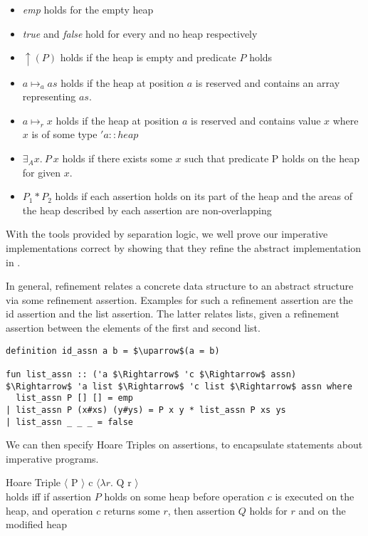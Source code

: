 \begin{itemize}
    \item \textit{emp} holds for the empty heap
    \item \textit{true} and \textit{false} hold for every and no heap respectively
    \item $\uparrow(P)$ holds if the heap is empty and predicate $P$ holds
    \item $a \mapsto_a as$ holds if the heap at position $a$ is reserved and contains
    an array representing $as$.
    \item $a \mapsto_r x$ holds if the heap at position $a$ is reserved and contains
    value $x$ where $x$ is of some type $'a::heap$
    \item $\exists_A x.\ P\ x$ holds if there exists some $x$ such that predicate P
    holds on the heap for given $x$.
    \item $P_1 * P_2$ holds if each assertion holds on its part of the heap
    and the areas of the heap described by each assertion are non-overlapping
\end{itemize}

With the tools provided by separation logic,
we well prove our imperative implementations correct
by showing that they refine the abstract implementation in .

In general, refinement relates a concrete data structure
to an abstract structure via some refinement assertion.
Examples for such a refinement assertion are the id assertion and the
list assertion.
The latter relates lists, given a refinement
assertion between the elements of the first and second list.

\begin{lstlisting}[mathescape=true, language=Isabelle]
definition id_assn a b = $\uparrow$(a = b)

fun list_assn :: ('a $\Rightarrow$ 'c $\Rightarrow$ assn) $\Rightarrow$ 'a list $\Rightarrow$ 'c list $\Rightarrow$ assn where
  list_assn P [] [] = emp
| list_assn P (x#xs) (y#ys) = P x y * list_assn P xs ys
| list_assn _ _ _ = false
\end{lstlisting}

We can then specify Hoare Triples on assertions,
to encapsulate statements about imperative programs.

\begin{definition}{Hoare Triple}
    $\langle$ P $\rangle$ c $\langle \lambda r. $ Q r $\rangle$ \\
    holds iff if assertion $P$ holds on some heap before operation $c$
    is executed on the heap,
    and operation $c$ returns some $r$, then assertion $Q$ holds
    for $r$ and on the modified heap
\end{definition}

